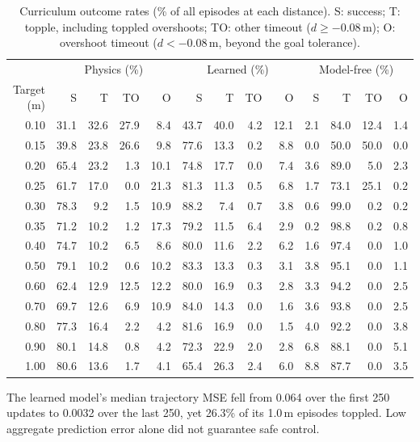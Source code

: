 \documentclass[12pt]{article}
\renewcommand{\arraystretch}{0.94}
\begin{document}
\begin{table}[htbp]
\centering
\small
\setlength{\tabcolsep}{2pt}
\renewcommand{\arraystretch}{0.98}
\begin{tabular*}{\textwidth}{@{\extracolsep{\fill}}r *{12}{r}@{}}
\toprule
& \multicolumn{4}{c}{Physics (\%)} & \multicolumn{4}{c}{Learned (\%)} & \multicolumn{4}{c}{Model-free (\%)}\\
\cmidrule(lr){2-5}\cmidrule(lr){6-9}\cmidrule(lr){10-13}
Target (m) & S & T & TO & O & S & T & TO & O & S & T & TO & O\\
\midrule
0.10 & 31.1 & 32.6 & 27.9 & 8.4 & 43.7 & 40.0 & 4.2 & 12.1 & 2.1 & 84.0 & 12.4 & 1.4 \\
0.15 & 39.8 & 23.8 & 26.6 & 9.8 & 77.6 & 13.3 & 0.2 & 8.8 & 0.0 & 50.0 & 50.0 & 0.0 \\
0.20 & 65.4 & 23.2 & 1.3 & 10.1 & 74.8 & 17.7 & 0.0 & 7.4 & 3.6 & 89.0 & 5.0 & 2.3 \\
0.25 & 61.7 & 17.0 & 0.0 & 21.3 & 81.3 & 11.3 & 0.5 & 6.8 & 1.7 & 73.1 & 25.1 & 0.2 \\
0.30 & 78.3 & 9.2 & 1.5 & 10.9 & 88.2 & 7.4 & 0.7 & 3.8 & 0.6 & 99.0 & 0.2 & 0.2 \\
0.35 & 71.2 & 10.2 & 1.2 & 17.3 & 79.2 & 11.5 & 6.4 & 2.9 & 0.2 & 98.8 & 0.2 & 0.8 \\
0.40 & 74.7 & 10.2 & 6.5 & 8.6 & 80.0 & 11.6 & 2.2 & 6.2 & 1.6 & 97.4 & 0.0 & 1.0 \\
0.50 & 79.1 & 10.2 & 0.6 & 10.2 & 83.3 & 13.3 & 0.3 & 3.1 & 3.8 & 95.1 & 0.0 & 1.1 \\
0.60 & 62.4 & 12.9 & 12.5 & 12.2 & 80.0 & 16.9 & 0.3 & 2.8 & 3.3 & 94.2 & 0.0 & 2.5 \\
0.70 & 69.7 & 12.6 & 6.9 & 10.9 & 84.0 & 14.3 & 0.0 & 1.6 & 3.6 & 93.8 & 0.0 & 2.5 \\
0.80 & 77.3 & 16.4 & 2.2 & 4.2 & 81.6 & 16.9 & 0.0 & 1.5 & 4.0 & 92.2 & 0.0 & 3.8 \\
0.90 & 80.1 & 14.8 & 0.8 & 4.2 & 72.3 & 22.9 & 2.0 & 2.8 & 6.8 & 88.1 & 0.0 & 5.1 \\
1.00 & 80.6 & 13.6 & 1.7 & 4.1 & 65.4 & 26.3 & 2.4 & 6.0 & 8.8 & 87.7 & 0.0 & 3.5 \\
\bottomrule
\end{tabular*}
\caption{Curriculum outcome rates (\% of all episodes at each distance). S: success; T: topple, including toppled overshoots; TO: other timeout ($d\ge-0.08$\,m); O: overshoot timeout ($d<-0.08$\,m, beyond the goal tolerance).}
\label{tab:ablation}
\end{table}
The learned model's median trajectory MSE fell from 0.064 over the first 250 updates to 0.0032 over the last 250, yet 26.3\% of its 1.0\,m episodes toppled. Low aggregate prediction error alone did not guarantee safe control.
\end{document}
